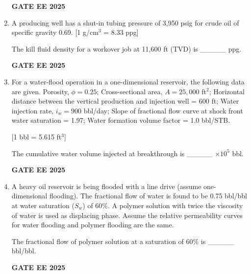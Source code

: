 \documentclass[twocolumn]{article}
\begin{document}
\begin{enumerate}[label=Q.\arabic*,start=26]
    \textbf{GATE EE 2025}
    
    \item A producing well has a shut-in tubing pressure of 3,950 psig for crude oil of specific gravity 0.69. [1 g/cm$^3$ = 8.33 ppg]
    
    The kill fluid density for a workover job at 11,600 ft (TVD) is \_\_\_\_\_ ppg.
    
    \textbf{GATE EE 2025}
    
    \item For a water-flood operation in a one-dimensional reservoir, the following data are given. Porosity, $\phi = 0.25$; Cross-sectional area, $A = 25,000$ ft$^2$; Horizontal distance between the vertical production and injection well = 600 ft; Water injection rate, $i_w = 900$ bbl/day; Slope of fractional flow curve at shock front water saturation = 1.97; Water formation volume factor = 1.0 bbl/STB.
    
    [1 bbl = 5.615 ft$^3$]
    
    The cumulative water volume injected at breakthrough is \_\_\_\_\_ $\times 10^5$ bbl.
    
    \textbf{GATE EE 2025}
    
    \item A heavy oil reservoir is being flooded with a line drive (assume one-dimensional flooding). The fractional flow of water is found to be 0.75 bbl/bbl at water saturation ($S_w$) of 60\%. A polymer solution with twice the viscosity of water is used as displacing phase. Assume the relative permeability curves for water flooding and polymer flooding are the same.
    
    The fractional flow of polymer solution at a saturation of 60\% is \_\_\_\_\_ bbl/bbl.
    
    \textbf{GATE EE 2025}
\end{enumerate}
\end{document}
